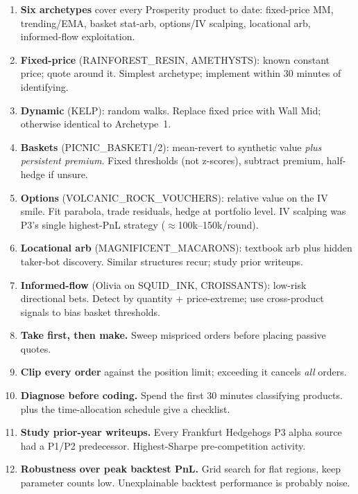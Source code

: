 \begin{enumerate}
  \item \textbf{Six archetypes} cover every Prosperity product to
  date: fixed-price MM, trending/EMA, basket stat-arb, options/IV
  scalping, locational arb, informed-flow exploitation.

  \item \textbf{Fixed-price} (RAINFOREST\_RESIN, AMETHYSTS): known
  constant price; quote around it.  Simplest archetype; implement
  within 30 minutes of identifying.

  \item \textbf{Dynamic} (KELP): random walks.  Replace fixed price
  with Wall Mid; otherwise identical to Archetype~1.

  \item \textbf{Baskets} (PICNIC\_BASKET1/2): mean-revert to
  synthetic value \emph{plus persistent premium}.  Fixed thresholds
  (not z-scores), subtract premium, half-hedge if unsure.

  \item \textbf{Options} (VOLCANIC\_ROCK\_VOUCHERS): relative value
  on the IV smile.  Fit parabola, trade residuals, hedge at
  portfolio level.  IV scalping was P3's single highest-PnL strategy
  ($\approx$100k--150k/round).

  \item \textbf{Locational arb} (MAGNIFICENT\_MACARONS): textbook
  arb plus hidden taker-bot discovery.  Similar structures recur;
  study prior writeups.

  \item \textbf{Informed-flow} (Olivia on SQUID\_INK, CROISSANTS):
  low-risk directional bets.  Detect by quantity + price-extreme;
  use cross-product signals to bias basket thresholds.

  \item \textbf{Take first, then make.}  Sweep mispriced orders
  before placing passive quotes.

  \item \textbf{Clip every order} against the position limit;
  exceeding it cancels \emph{all} orders.

  \item \textbf{Diagnose before coding.}  Spend the first 30 minutes
  classifying products.   plus the
  time-allocation schedule give a checklist.

  \item \textbf{Study prior-year writeups.}  Every Frankfurt
  Hedgehogs P3 alpha source had a P1/P2 predecessor.  Highest-Sharpe
  pre-competition activity.

  \item \textbf{Robustness over peak backtest PnL.}  Grid search for
  flat regions, keep parameter counts low.  Unexplainable backtest
  performance is probably noise.
\end{enumerate}
